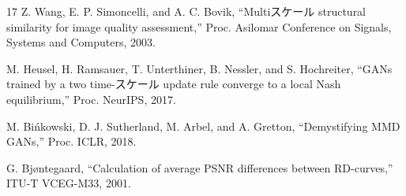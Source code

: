 \documentclass[MIRU,submit]{miru2026j}
\begin{document}
\begin{thebibliography}{17}
Z. Wang, E. P. Simoncelli, and A. C. Bovik,
``Multiスケール structural similarity for image quality assessment,''
Proc. Asilomar Conference on Signals, Systems and Computers, 2003.

M. Heusel, H. Ramsauer, T. Unterthiner, B. Nessler, and S. Hochreiter,
``GANs trained by a two time-スケール update rule converge to a local Nash equilibrium,''
Proc. NeurIPS, 2017.

M. Bi\'nkowski, D. J. Sutherland, M. Arbel, and A. Gretton,
``Demystifying MMD GANs,''
Proc. ICLR, 2018.

G. Bj{\o}ntegaard,
``Calculation of average PSNR differences between RD-curves,''
ITU-T VCEG-M33, 2001.
\end{thebibliography}
\end{document}
